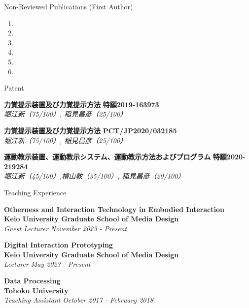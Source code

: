 \documentclass{resume} %
\begin{document}
\begin{rSection}{Non-Reviewed Publications (First Author)}
  \begin{enumerate}
    \item {}
    \item {}
    \item {}
    \item {}
    \item {}
    \item {}
  \end{enumerate}
\end{rSection}

\begin{rSection}{Patent}

{\bf 力覚提示装置及び力覚提示方法} \hfill {\bf 特願2019-163973} 
\\{\em 堀江新（75/100）, 稲見昌彦（25/100）} \hfill {\em }

{\bf 力覚提示装置及び力覚提示方法} \hfill {\bf PCT/JP2020/032185} 
\\{\em 堀江新（75/100）, 稲見昌彦（25/100）} \hfill {\em }

{\bf 運動教示装置、運動教示システム、運動教示方法およびプログラム} \hfill {\bf 特願2020-219284} 
\\{\em 堀江新（45/100）,檜山敦（35/100）, 稲見昌彦（20/100）} \hfill {\em }

\end{rSection}

\begin{rSection}{Teaching Experience}

{\bf Otherness and Interaction Technology in Embodied Interaction} 
\\{\bf Keio University Graduate School of Media Design} 
\\{\em Guest Lecturer} \hfill {\em November 2023 - Present}

{\bf Digital Interaction Prototyping} 
\\{\bf Keio University Graduate School of Media Design} 
\\{\em Lecturer} \hfill {\em May 2023 - Present}

{\bf Data Processing}
\\{\bf Tohoku University} 
\\{\em Teaching Assistant} \hfill {\em October 2017 - February 2018}

\end{rSection}
\end{document}

